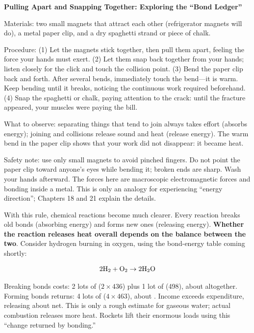 \begin{shiyan}
\textbf{Pulling Apart and Snapping Together: Exploring the ``Bond Ledger''}

Materials: two small magnets that attract each other (refrigerator magnets will do), a metal paper clip, and a dry spaghetti strand or piece of chalk.

Procedure: (1) Let the magnets stick together, then pull them apart, feeling the force your hands must exert. (2) Let them snap back together from your hands; listen closely for the click and touch the collision point. (3) Bend the paper clip back and forth. After several bends, immediately touch the bend---it is warm. Keep bending until it breaks, noticing the continuous work required beforehand. (4) Snap the spaghetti or chalk, paying attention to the crack: until the fracture appeared, your muscles were paying the bill.

What to observe: separating things that tend to join always takes effort (absorbs energy); joining and collisions release sound and heat (release energy). The warm bend in the paper clip shows that your work did not disappear: it became heat.

Safety note: use only small magnets to avoid pinched fingers. Do not point the paper clip toward anyone's eyes while bending it; broken ends are sharp. Wash your hands afterward. The forces here are macroscopic electromagnetic forces and bonding inside a metal. This is only an analogy for experiencing ``energy direction''; Chapters 18 and 21 explain the details.
\end{shiyan}

With this rule, chemical reactions become much clearer. Every reaction breaks old bonds (absorbing energy) and forms new ones (releasing energy). \textbf{Whether the reaction releases heat overall depends on the balance between the two}. Consider hydrogen burning in oxygen, using the bond-energy table coming shortly:

\[ \mathrm{2H_2} + \mathrm{O_2} \rightarrow \mathrm{2H_2O} \]

Breaking bonds costs: 2 lots of  ($2\times 436$) plus 1 lot of  (498), about  altogether. Forming bonds returns: 4 lots of  ($4\times 463$), about . Income exceeds expenditure, releasing about  net. This is only a rough estimate for gaseous water; actual combustion releases more heat. Rockets lift their enormous loads using this ``change returned by bonding.''

